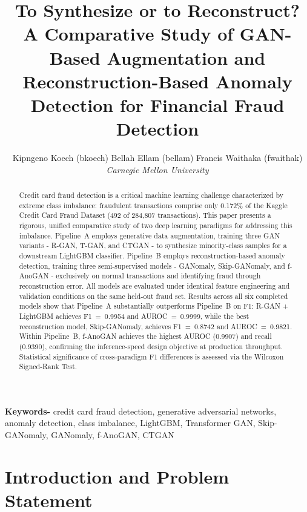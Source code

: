\documentclass[conference]{IEEEtran}
\begin{document}
\title{\fontsize{18pt}{22pt}\selectfont
To Synthesize or to Reconstruct? A Comparative Study of GAN-Based Augmentation and Reconstruction-Based Anomaly Detection for Financial Fraud Detection }

\author{
  Kipngeno Koech (bkoech) \quad Bellah Ellam (bellam) \quad Francis Waithaka (fwaithak) \\
  \textit{Carnegie Mellon University}
}

\maketitle

\begin{abstract}
Credit card fraud detection is a critical machine learning challenge
characterized by extreme class imbalance: fraudulent transactions comprise
only 0.172\% of the Kaggle Credit Card Fraud Dataset (492 of 284,807
transactions). This paper presents a rigorous, unified comparative study of
two deep learning paradigms for addressing this imbalance. Pipeline~A
employs generative data augmentation, training three GAN variants -
R-GAN, T-GAN, and CTGAN - to synthesize minority-class samples for a
downstream LightGBM classifier. Pipeline~B employs reconstruction-based
anomaly detection, training three semi-supervised models - GANomaly,
Skip-GANomaly, and f-AnoGAN - exclusively on normal transactions and
identifying fraud through reconstruction error. All models are evaluated
under identical feature engineering and validation conditions on the same
held-out fraud set. Results across all six completed models show that
Pipeline~A substantially outperforms Pipeline~B on F1: R-GAN + LightGBM
achieves F1~=~0.9954 and AUROC~=~0.9999, while the best reconstruction
model, Skip-GANomaly, achieves F1~=~0.8742 and AUROC~=~0.9821. Within
Pipeline~B, f-AnoGAN achieves the highest AUROC (0.9907) and recall
(0.9390), confirming the inference-speed design objective at production
throughput. Statistical significance of cross-paradigm F1 differences
is assessed via the Wilcoxon Signed-Rank Test.
\end{abstract}

\smallskip\noindent\textbf{Keywords-}
credit card fraud detection, generative adversarial networks, anomaly
detection, class imbalance, LightGBM, Transformer GAN, Skip-GANomaly,
GANomaly, f-AnoGAN, CTGAN


\section{Introduction and Problem Statement}
\end{document}

